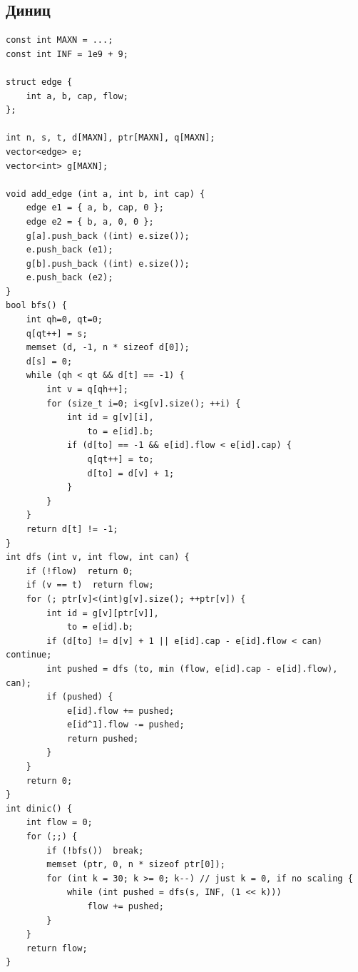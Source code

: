 \documentclass[10pt, portrait,letterpaper]{article}
\begin{document}
\subsection{Диниц}

\begin{verbatim}
const int MAXN = ...;
const int INF = 1e9 + 9;

struct edge {
    int a, b, cap, flow;
};

int n, s, t, d[MAXN], ptr[MAXN], q[MAXN];
vector<edge> e;
vector<int> g[MAXN];

void add_edge (int a, int b, int cap) {
    edge e1 = { a, b, cap, 0 };
    edge e2 = { b, a, 0, 0 };
    g[a].push_back ((int) e.size());
    e.push_back (e1);
    g[b].push_back ((int) e.size());
    e.push_back (e2);
}
bool bfs() {
    int qh=0, qt=0;
    q[qt++] = s;
    memset (d, -1, n * sizeof d[0]);
    d[s] = 0;
    while (qh < qt && d[t] == -1) {
        int v = q[qh++];
        for (size_t i=0; i<g[v].size(); ++i) {
            int id = g[v][i],
                to = e[id].b;
            if (d[to] == -1 && e[id].flow < e[id].cap) {
                q[qt++] = to;
                d[to] = d[v] + 1;
            }
        }
    }
    return d[t] != -1;
}
int dfs (int v, int flow, int can) {
    if (!flow)  return 0;
    if (v == t)  return flow;
    for (; ptr[v]<(int)g[v].size(); ++ptr[v]) {
        int id = g[v][ptr[v]],
            to = e[id].b;
        if (d[to] != d[v] + 1 || e[id].cap - e[id].flow < can)  continue;
        int pushed = dfs (to, min (flow, e[id].cap - e[id].flow), can);
        if (pushed) {
            e[id].flow += pushed;
            e[id^1].flow -= pushed;
            return pushed;
        }
    }
    return 0;
}
int dinic() {
    int flow = 0;
    for (;;) {
        if (!bfs())  break;
        memset (ptr, 0, n * sizeof ptr[0]);
        for (int k = 30; k >= 0; k--) // just k = 0, if no scaling {
            while (int pushed = dfs(s, INF, (1 << k)))
                flow += pushed;
        }
    }
    return flow;
}
\end{verbatim}
\end{document}
